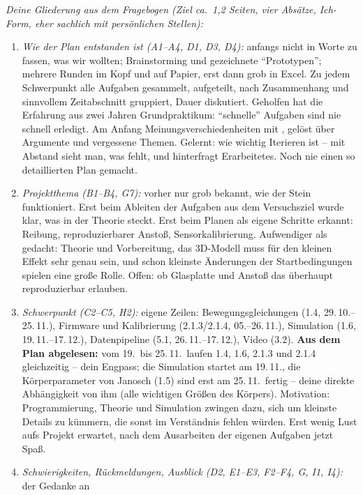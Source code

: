 \begin{hinweise}
\smallskip\emph{Deine Gliederung aus dem Fragebogen (Ziel ca.\ 1{,}2 Seiten, vier Absätze, Ich-Form,
eher sachlich mit persönlichen Stellen):}
\begin{enumerate}\itemsep0pt
\item \emph{Wie der Plan entstanden ist (A1--A4, D1, D3, D4):} anfangs nicht in Worte zu fassen, was
      wir wollten; Brainstorming und gezeichnete \enquote{Prototypen}; mehrere Runden im Kopf und auf
      Papier, erst dann grob in Excel. Zu jedem Schwerpunkt alle Aufgaben gesammelt, aufgeteilt, nach
      Zusammenhang und sinnvollem Zeitabschnitt gruppiert, Dauer diskutiert. Geholfen hat die Erfahrung
      aus zwei Jahren Grundpraktikum: \enquote{schnelle} Aufgaben sind nie schnell erledigt. Am Anfang
      Meinungsverschiedenheiten mit \Partner, gelöst über Argumente und vergessene Themen. Gelernt: wie
      wichtig Iterieren ist -- mit Abstand sieht man, was fehlt, und hinterfragt Erarbeitetes. Noch nie
      einen so detaillierten Plan gemacht.
\item \emph{Projektthema (B1--B4, G7):} vorher nur grob bekannt, wie der Stein funktioniert. Erst beim
      Ableiten der Aufgaben aus dem Versuchsziel wurde klar, was in der Theorie steckt. Erst beim Planen
      als eigene Schritte erkannt: Reibung, reproduzierbarer Anstoß, Sensorkalibrierung. Aufwendiger als
      gedacht: Theorie und Vorbereitung, das 3D-Modell muss für den kleinen Effekt sehr genau sein, und
      schon kleinste Änderungen der Startbedingungen spielen eine große Rolle. Offen: ob Glasplatte und
      Anstoß das überhaupt reproduzierbar erlauben.
\item \emph{Schwerpunkt (C2--C5, H2):} eigene Zeilen: Bewegungsgleichungen (1.4, 29.\,10.--25.\,11.),
      Firmware und Kalibrierung (2.1.3/2.1.4, 05.--26.\,11.), Simulation (1.6, 19.\,11.--17.\,12.),
      Datenpipeline (5.1, 26.\,11.--17.\,12.), Video (3.2). \textbf{Aus dem Plan abgelesen:} vom 19.\ bis
      25.\,11.\ laufen 1.4, 1.6, 2.1.3 und 2.1.4 gleichzeitig -- dein Engpass; die Simulation startet
      am 19.\,11., die Körperparameter von Janosch (1.5) sind erst am 25.\,11.\ fertig -- deine direkte
      Abhängigkeit von ihm (alle wichtigen Größen des Körpers). Motivation: Programmierung, Theorie und
      Simulation zwingen dazu, sich um kleinste Details zu kümmern, die sonst im Verständnis fehlen
      würden. Erst wenig Lust aufs Projekt erwartet, nach dem Ausarbeiten der eigenen Aufgaben jetzt Spaß.
\item \emph{Schwierigkeiten, Rückmeldungen, Ausblick (D2, E1--E3, F2--F4, G, I1, I4):} der Gedanke an

\end{enumerate}
\end{hinweise}
